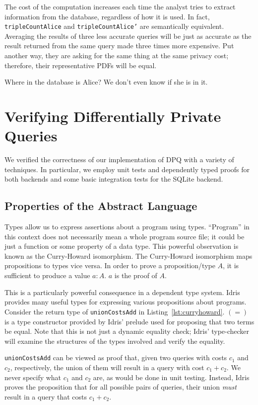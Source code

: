 \documentclass[12pt]{report}
\begin{document}
The cost of the computation increases each time the analyst tries to extract information from the database, regardless of how it is used.
In fact, \texttt{tripleCountAlice} and \texttt{tripleCountAlice'} are semantically equivalent.
Averaging the results of three less accurate queries will be just as accurate as the result returned from the same query made three times more expensive.
Put another way, they are asking for the same thing at the same privacy cost; therefore, their representative PDFs will be equal.

Where in the database is Alice?
We don't even know if she is in it.

\section{Verifying Differentially Private Queries}

We verified the correctness of our implementation of DPQ with a variety of techniques.
In particular, we employ unit tests and dependently typed proofs for both backends and some basic integration tests for the SQLite backend.

\subsection{Properties of the Abstract Language}

Types allow us to express assertions about a program using types.
``Program'' in this context does not necessarily mean a whole program source file; it could be just a function or some property of a data type.
This powerful observation is known as the Curry-Howard isomorphism.
The Curry-Howard isomorphism maps propositions to types vice versa.
In order to prove a proposition/type $A$, it is sufficient to produce a value $a : A$.
$a$ is the proof of $A$.

This is a particularly powerful consequence in a dependent type system.
Idris provides many useful types for expressing various propositions about programs.
Consider the return type of \texttt{unionCostsAdd} in Listing~\ref{lst:curryhoward}.
$(=)$ is a type constructor provided by Idris' prelude used for proposing that two terms be equal.
Note that this is not just a dynamic equality check; Idris' type-checker will examine the structures of the types involved and verify the equality.

\texttt{unionCostsAdd} can be viewed as proof that, given two queries with costs $c_1$ and $c_2$, respectively, the union of them will result in a query with cost $c_1 + c_2$.
We never specify what $c_1$ and $c_2$ are, as would be done in unit testing.
Instead, Idris proves the proposition that for all possible pairs of queries, their union \textit{must} result in a query that costs $c_1 + c_2$.
\end{document}
